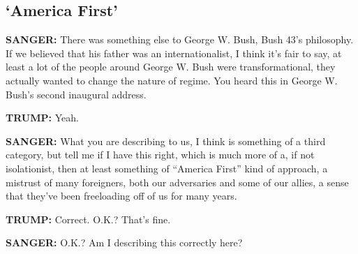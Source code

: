 \hypertarget{america-first}{%
\subsection{`America First'}\label{america-first}}

\textbf{SANGER:} There was something else to George W. Bush, Bush 43's
philosophy. If we believed that his father was an internationalist, I
think it's fair to say, at least a lot of the people around George W.
Bush were transformational, they actually wanted to change the nature of
regime. You heard this in George W. Bush's second inaugural address.

\textbf{TRUMP:} Yeah.

\textbf{SANGER:} What you are describing to us, I think is something of
a third category, but tell me if I have this right, which is much more
of a, if not isolationist, then at least something of ``America First''
kind of approach, a mistrust of many foreigners, both our adversaries
and some of our allies, a sense that they've been freeloading off of us
for many years.

\textbf{TRUMP:} Correct. O.K.? That's fine.

\textbf{SANGER:} O.K.? Am I describing this correctly here?

